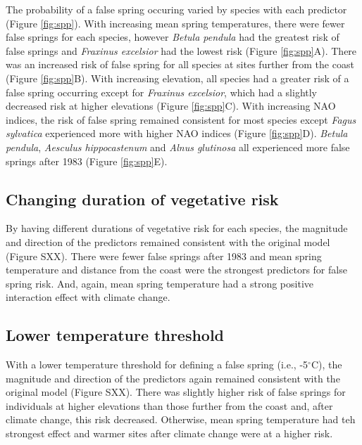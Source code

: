 \documentclass{article}\usepackage[]{graphicx}\usepackage[]{color}
\begin{document}
The probability of a false spring occuring varied by species with each predictor (Figure \ref{fig:spp}). With increasing mean spring temperatures, there were fewer false springs for each species, however \textit{Betula pendula} had the greatest risk of false springs and \textit{Fraxinus excelsior} had the lowest risk (Figure \ref{fig:spp}A). There was an increased risk of false spring for all species at sites further from the coast (Figure \ref{fig:spp}B). With increasing elevation, all species had a greater risk of a false spring occurring except for \textit{Fraxinus excelsior}, which had a slightly decreased risk at higher elevations (Figure \ref{fig:spp}C).  With increasing NAO indices, the risk of false spring remained consistent for most species except \textit{Fagus sylvatica} experienced more with higher NAO indices (Figure \ref{fig:spp}D). \textit{Betula pendula}, \textit{Aesculus hippocastenum} and \textit{Alnus glutinosa} all experienced more false springs after 1983 (Figure \ref{fig:spp}E).

\subsection*{Changing duration of vegetative risk}
By having different durations of vegetative risk for each species, the magnitude and direction of the predictors remained consistent with the original model (Figure SXX). There were fewer false springs after 1983 and mean spring temperature and distance from the coast were the strongest predictors for false spring risk. And, again, mean spring temperature had a strong positive interaction effect with climate change. 

\subsection*{Lower temperature threshold}
With a lower temperature threshold for defining a false spring (i.e., -5$^{\circ}$C), the magnitude and direction of the predictors again remained consistent with the original model (Figure SXX). There was slightly higher risk of false springs for individuals at higher elevations than those further from the coast and, after climate change, this risk decreased. Otherwise, mean spring temperature had teh strongest effect and warmer sites after climate change were at a higher risk. 
\end{document}

